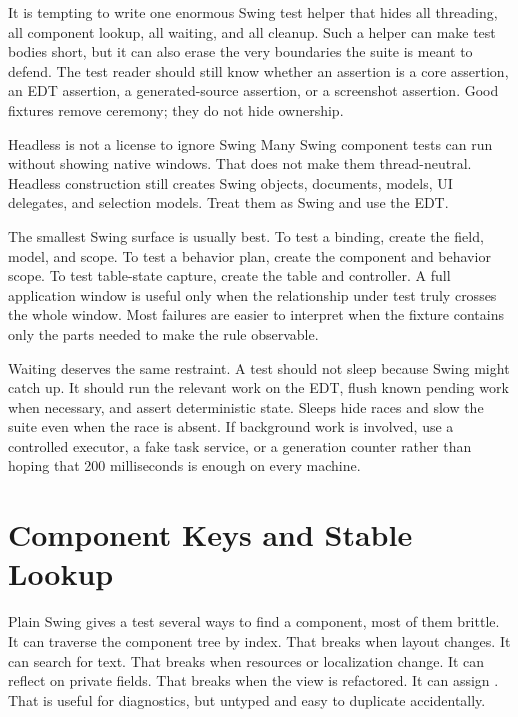 It is tempting to write one enormous Swing test helper that hides all threading, all component lookup, all waiting, and all cleanup. Such a helper can make test bodies short, but it can also erase the very boundaries the suite is meant to defend. The test reader should still know whether an assertion is a core assertion, an EDT assertion, a generated-source assertion, or a screenshot assertion. Good fixtures remove ceremony; they do not hide ownership.

\begin{detailbox}{Headless is not a license to ignore Swing}
Many Swing component tests can run without showing native windows. That does not make them thread-neutral. Headless construction still creates Swing objects, documents, models, UI delegates, and selection models. Treat them as Swing and use the EDT.
\end{detailbox}

The smallest Swing surface is usually best. To test a binding, create the field, model, and scope. To test a behavior plan, create the component and behavior scope. To test table-state capture, create the table and controller. A full application window is useful only when the relationship under test truly crosses the whole window. Most failures are easier to interpret when the fixture contains only the parts needed to make the rule observable.

Waiting deserves the same restraint. A test should not sleep because Swing might catch up. It should run the relevant work on the EDT, flush known pending work when necessary, and assert deterministic state. Sleeps hide races and slow the suite even when the race is absent. If background work is involved, use a controlled executor, a fake task service, or a generation counter rather than hoping that 200 milliseconds is enough on every machine.

\section{Component Keys and Stable Lookup}

Plain Swing gives a test several ways to find a component, most of them brittle. It can traverse the component tree by index. That breaks when layout changes. It can search for text. That breaks when resources or localization change. It can reflect on private fields. That breaks when the view is refactored. It can assign . That is useful for diagnostics, but untyped and easy to duplicate accidentally.

